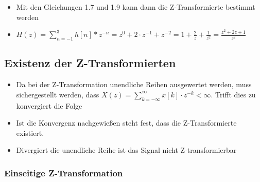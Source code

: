\documentclass[11pt]{article}
\def\lt{<}
\begin{document}
\begin{itemize}
\item
  Mit den Gleichungen 1.7 und 1.9 kann dann die Z-Transformierte
  bestimmt werden
\item
  \(H(z) = \sum_{n=-1}^{3} h[n] * z^{-n} = z^0 + 2 \cdot z^{-1} + z^{-2} = 1 + \frac{2}{z} + \frac{1}{z^2} = \frac{z^2 + 2z + 1}{z^2}\)
\end{itemize}

    \subsection{Existenz der
Z-Transformierten}\label{existenz-der-z-transformierten}

\begin{itemize}
\item
  Da bei der Z-Transformation unendliche Reihen ausgewertet werden, muss
  sichergestellt werden, dass
  \(X(z) = \sum_{k=-\infty}^\infty x[k] \cdot z^{-k} \lt \infty\).
  Trifft dies zu konvergiert die Folge
\item
  Ist die Konvergenz nachgewießen steht fest, dass die Z-Transformierte
  existiert.
\item
  Divergiert die unendliche Reihe ist das Signal nicht Z-transformierbar
\end{itemize}

\subsubsection{Einseitige
Z-Transformation}\label{einseitige-z-transformation}
\end{document}
